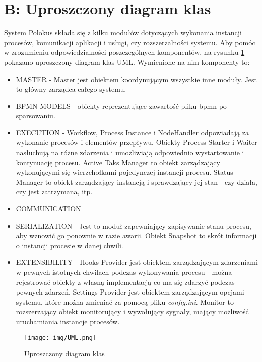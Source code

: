 \documentclass[declaration,shortabstract,mgr]{iithesis}
\newcommand{\bpmn}{BPMN }
\begin{document}
\section*{B: Uproszczony diagram klas}
System Polokus składa się z kilku modułów dotyczących wykonania instancji procesów, komunikacji aplikacji i usługi, czy rozszerzalności systemu. Aby pomóc w zrozumieniu odpowiedzialności poszczególnych komponentów, na rysunku \ref{fig:uml} pokazano uproszczony diagram klas UML. Wymienione na nim komponenty to:
\begin{itemize}
    \item MASTER - Master jest obiektem koordynującym wszystkie inne moduły. Jest to główny zarządca całego systemu.
    \item BPMN MODELS - obiekty reprezentujące zawartość pliku bpmn po sparsowaniu.
    \item EXECUTION - Workflow, Process Instance i NodeHandler odpowiadają za wykonanie procesów i elementów przepływu. Obiekty Process Starter i Waiter nasłuchują na różne zdarzenia i umożliwiają odpowiednio wystartowanie i kontynuację procesu. Active Taks Manager to obiekt zarządzający wykonującymi się wierzchołkami pojedynczej instancji procesu. Status Manager to obiekt zarządzający instancją i sprawdzający jej stan - czy działa, czy jest zatrzymana, itp.
    \item COMMUNICATION
    \item SERIALIZATION - Jest to moduł zapewniający zapisywanie stanu procesu, aby wznowić go ponownie w razie awarii. Obiekt Snapshot to skrót informacji o instancji procesie w danej chwili.
    \item EXTENSIBILITY - Hooks Provider jest obiektem zarządzającym zdarzeniami w pewnych istotnych chwilach podczas wykonywania procesu - można rejestrować obiekty z własną implementacją co ma się zdarzyć podczas pewnych zdarzeń. Settings Provider jest obiektem zarządzającym opcjami systemu, które można zmieniać za pomocą pliku \textit{config.ini}. Monitor to rozszerzający obiekt monitorujący i wywołujący sygnały, mający możliwość uruchamiania instancje procesów.    
\end{itemize}

\newpage
\begin{figure}[H]
    \texttt{[image: img/UML.png]}
    \caption{Uproszczony diagram klas}
    \label{fig:uml}
\end{figure}
 \clearpage


\end{document}
